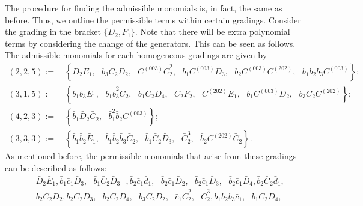 \documentclass[10pt]{amsart}
\theoremstyle{definition}
\theoremstyle{corollary}
\theoremstyle{remark}
\theoremstyle{conclusion}
\begin{document}
The procedure for finding the admissible monomials is, in fact, the same as before. Thus, we outline the permissible terms within certain gradings. Consider the grading in the bracket $\{\bar{D}_2,\bar{F}_1\}.$ Note that there will be extra polynomial terms by considering the change of the generators. This can be seen as follows. The admissible monomials for each homogeneous gradings are given by  \begin{align}
\nonumber
 (2,2,5) := & \, \left\{\bar{D}_2\bar{E}_1, \text{ } \bar{b}_3 \bar{C}_2 \bar{D}_2, \text{ }C^{(003)} \bar{C}_2^2, \text{ }\bar{b}_1 C^{(003)} \bar{D}_3, \text{ }\bar{b}_2 C^{(003)} C^{(202)}, \text{ }\bar{b}_1 \bar{b}_2 \bar{b}_3 C^{(003)}\right\}; \\
 (3,1,5):= & \, \left\{\bar{b}_1\bar{b}_3\bar{E}_1, \text{ }\bar{b}_1\bar{b}_3^2\bar{C}_2,    \text{ }\bar{b}_1\bar{C}_2\bar{D}_4, \text{ }\bar{C}_2 \bar{F}_2, \text{ }C^{(202)} \bar{E}_1 , \text{ }\bar{b}_1 C^{(003)} \bar{D}_2, \text{ } \bar{b}_3 \bar{C}_2 C^{(202)} \right\} ; \label{eq:gradingd2f1} \\ 
 \nonumber
 (4,2,3) := & \, \left\{\bar{b}_1\bar{D}_2\bar{C}_2, \text{ }\bar{b}_1^2\bar{b}_2C^{(003)}\right\}; \\
 \nonumber
 (3,3,3) := & \, \left\{\bar{b}_1\bar{b}_2\bar{E}_1, \text{ }\bar{b}_1\bar{b}_2\bar{b}_3\bar{C}_2, \text{ }\bar{b}_1\bar{C}_2\bar{D}_3, \text{ } \bar{C}_2^3, \text{ }\bar{b}_2C^{(202)}\bar{C}_2\right\} .
\end{align}  As mentioned before, the permissible monomials that arise from these gradings can be described as follows: \begin{align*}
   & \,  \bar{D}_2 \bar{E}_1,\bar{b}_1 \bar{c}_1 \bar{D}_3,\text{ } \bar{b}_1 \bar{C}_2 \bar{D}_3\text{ } ,\bar{b}_2 \bar{c}_1 \bar{d}_1,\text{ } \bar{b}_2 \bar{c}_1 \bar{D}_2,\text{ } \bar{b}_2 \bar{c}_1 \bar{D}_3,\text{ } \bar{b}_2 \bar{c}_1 \bar{D}_4,\bar{b}_2 \bar{C}_2 \bar{d}_1, \\
   & \, \bar{b}_2 \bar{C}_2 \bar{D}_2,\bar{b}_2 \bar{C}_2 \bar{D}_3,\text{ } \bar{b}_2 \bar{C}_2 \bar{D}_4,\text{ } \bar{b}_3 \bar{C}_2 \bar{D}_2,\text{ } \bar{c}_1 \bar{C}_2^2,\text{ } \bar{C}_2^3,\bar{b}_1 \bar{b}_2 \bar{b}_3 \bar{c}_1, \text{ } \bar{b}_1 \bar{C}_2 \bar{D}_4,\\

\end{align*}
\end{document}
